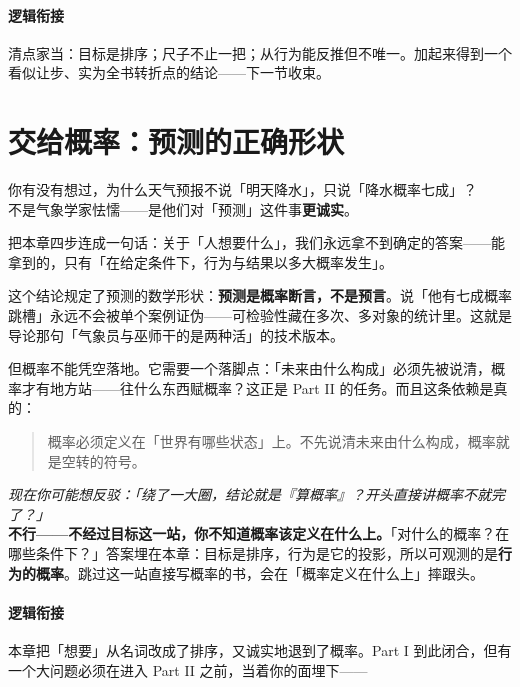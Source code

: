 \documentclass[../../main2.tex]{subfiles}
\begin{document}
\paragraph*{逻辑衔接}
	清点家当：目标是排序；尺子不止一把；从行为能反推但不唯一。加起来得到一个看似让步、实为全书转折点的结论——下一节收束。

\section{交给概率：预测的正确形状}

\begin{readingnote}
	你有没有想过，为什么天气预报不说「明天降水」，只说「降水概率七成」？\\
	不是气象学家怯懦——是他们对「预测」这件事\textbf{更诚实}。
\end{readingnote}

把本章四步连成一句话：关于「人想要什么」，我们永远拿不到确定的答案——能拿到的，只有「在给定条件下，行为与结果以多大概率发生」。

这个结论规定了预测的数学形状：\textbf{预测是概率断言，不是预言}。说「他有七成概率跳槽」永远不会被单个案例证伪——可检验性藏在多次、多对象的统计里。这就是导论那句「气象员与巫师干的是两种活」的技术版本。

但概率不能凭空落地。它需要一个落脚点：「未来由什么构成」必须先被说清，概率才有地方站——往什么东西赋概率？这正是 Part II 的任务。而且这条依赖是真的：

\begin{quote}
	概率必须定义在「世界有哪些状态」上。不先说清未来由什么构成，概率就是空转的符号。
\end{quote}

\begin{questionbox}
	\textit{现在你可能想反驳：「绕了一大圈，结论就是『算概率』？开头直接讲概率不就完了？」}\\
	\textbf{不行——不经过目标这一站，你不知道概率该定义在什么上。}「对什么的概率？在哪些条件下？」答案埋在本章：目标是排序，行为是它的投影，所以可观测的是\textbf{行为的概率}。跳过这一站直接写概率的书，会在「概率定义在什么上」摔跟头。
\end{questionbox}

\paragraph*{逻辑衔接}
	本章把「想要」从名词改成了排序，又诚实地退到了概率。Part I 到此闭合，但有一个大问题必须在进入 Part II 之前，当着你的面埋下——
\end{document}
